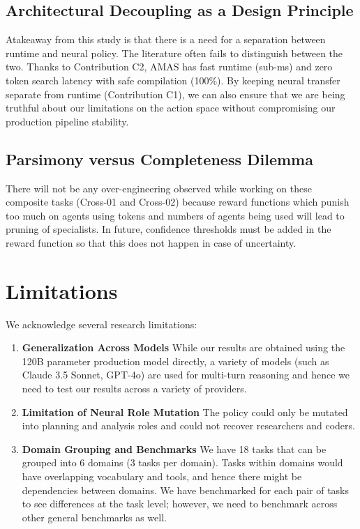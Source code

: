 \documentclass[conference]{IEEEtran}
\begin{document}
\subsection{Architectural Decoupling as a Design Principle}
Atakeaway from this study is that there is a need for a separation between runtime and neural policy. The literature often fails to distinguish between the two. Thanks to Contribution C2, AMAS has fast runtime (sub-ms) and zero token search latency with safe compilation (100\%). By keeping neural transfer separate from runtime (Contribution C1), we can also ensure that we are being truthful about our limitations on the action space without compromising our production pipeline stability.

\subsection{Parsimony versus Completeness Dilemma}
There will not be any over-engineering observed while working on these composite tasks (Cross-01 and Cross-02) because reward functions which punish too much on agents using tokens and numbers of agents being used will lead to pruning of specialists. In future, confidence thresholds must be added in the reward function so that this does not happen in case of uncertainty.

\section{Limitations}
\label{sec:limitations}

We acknowledge several research limitations:
\begin{enumerate}[leftmargin=*]
\item \textbf{Generalization Across Models} While our results are obtained using the 120B parameter production model directly, a variety of models (such as Claude 3.5 Sonnet, GPT-4o) are used for multi-turn reasoning and hence we need to test our results across a variety of providers.
\item \textbf{Limitation of Neural Role Mutation} The policy could only be mutated into planning and analysis roles and could not recover researchers and coders.
\item \textbf{Domain Grouping and Benchmarks} We have 18 tasks that can be grouped into 6 domains (3 tasks per domain). Tasks within domains would have overlapping vocabulary and tools, and hence there might be dependencies between domains. We have benchmarked for each pair of tasks to see differences at the task level; however, we need to benchmark across other general benchmarks as well.
\end{enumerate}
\end{document}
